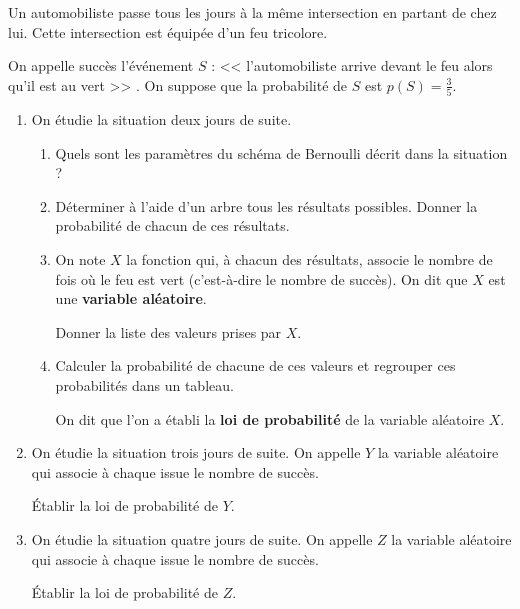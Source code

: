\documentclass[12pt,openright,twoside,french]{book}
\begin{document}

Un automobiliste passe tous les jours à la même intersection en partant de chez lui. Cette intersection est équipée d’un feu tricolore.\par On appelle succès l’événement $S$ : << l’automobiliste arrive devant le feu alors qu’il est au vert >> . On suppose que la probabilité de $S$ est $p(S) = \frac 3 5$.\bigskip

\begin{enumerate}
    \item On étudie la situation deux jours de suite.
        \begin{enumerate}
            \item Quels sont les paramètres du schéma de Bernoulli décrit dans la situation ?
            \item Déterminer à l’aide d’un arbre tous les résultats possibles. Donner la probabilité de chacun de ces résultats.
            \item On note $X$ la fonction qui, à chacun des résultats, associe le nombre de fois où le feu est vert (c'est-à-dire le nombre de succès). On dit que $X$ est une \textbf{variable aléatoire}.\par
                Donner la liste des valeurs prises par $X$.\par
            \item Calculer la probabilité de chacune de ces valeurs et regrouper ces probabilités dans un tableau.\par
                On dit que l’on a établi la \textbf{loi de probabilité} de la variable aléatoire $X$.
        \end{enumerate}

    \item On étudie la situation trois jours de suite. On appelle $Y$ la variable aléatoire qui associe à chaque issue le nombre de succès.\par
    \'Etablir la loi de probabilité de $Y$.

    \item On étudie la situation quatre jours de suite. On appelle $Z$ la variable aléatoire qui associe à chaque issue le nombre de succès.\par
    \'Etablir la loi de probabilité de $Z$.

\end{enumerate}
\end{document}
